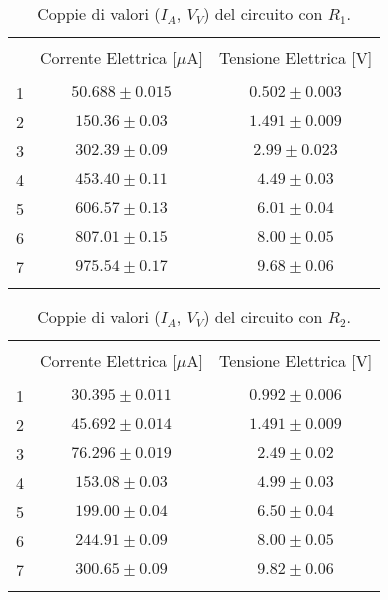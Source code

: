 \begin{table}
    \centering
    \footnotesize
    \caption{Coppie di valori ($I_A$, $V_V$) del circuito con $R_1$.}
    \label{table:R1}
    \begin{tabular}{lcc}
        \hline\hline\\[-1.5ex]
          & Corrente Elettrica [$\mu$A] & Tensione Elettrica [V] \\[+0.5ex] \hline \\[-1.5ex]
        1 & $50.688\pm0.015$            & $0.502\pm0.003$        \\[+0.5ex]
        2 & $150.36\pm0.03 $            & $1.491\pm0.009$        \\[+0.5ex]
        3 & $302.39\pm0.09 $            & $2.99 \pm0.023$        \\[+0.5ex]
        4 & $453.40\pm0.11 $            & $4.49 \pm0.03 $        \\[+0.5ex]
        5 & $606.57\pm0.13 $            & $6.01 \pm0.04 $        \\[+0.5ex]
        6 & $807.01\pm0.15 $            & $8.00 \pm0.05 $        \\[+0.5ex]
        7 & $975.54\pm0.17 $            & $9.68 \pm0.06 $        \\[+0.5ex] \hline \\[-1.5ex]   
    \end{tabular}
\end{table}

\begin{table}
    \centering
    \footnotesize
    \caption{Coppie di valori ($I_A$, $V_V$) del circuito con $R_2$.}
    \label{table:R2}
    \begin{tabular}{lcc}
        \hline\hline\\[-1.5ex]
          & Corrente Elettrica [$\mu$A] & Tensione Elettrica [V] \\[+0.5ex] \hline \\[-1.5ex]
        1 & $30.395\pm0.011$            & $0.992\pm 0.006$        \\[+0.5ex]
        2 & $45.692\pm0.014$            & $1.491\pm 0.009$        \\[+0.5ex]
        3 & $76.296\pm0.019$            & $2.49 \pm 0.02 $        \\[+0.5ex]
        4 & $153.08\pm0.03 $            & $4.99 \pm 0.03 $        \\[+0.5ex]
        5 & $199.00\pm0.04 $            & $6.50 \pm 0.04 $        \\[+0.5ex]
        6 & $244.91\pm0.09 $            & $8.00 \pm 0.05 $        \\[+0.5ex]
        7 & $300.65\pm0.09 $            & $9.82 \pm 0.06 $        \\[+0.5ex] \hline \\[-1.5ex]   
    \end{tabular}
\end{table}